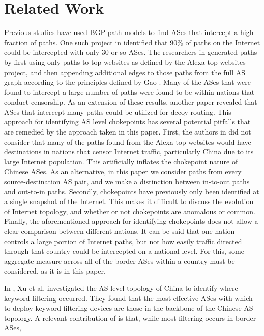 \section{Related Work}   
\par
Previous studies have used BGP path models to find ASes that
intercept a high fraction of paths. One such project in \cite{throats}
identified that 90\% of paths on the Internet could be intercepted with only 30
or so ASes. The researchers in \cite{throats} generated paths by first using
only paths to top websites as defined by the Alexa top websites project,
and then appending additional edges to those paths from the full
AS graph according to the principles defined by Gao \cite{gao}. Many of the
ASes that were found to intercept a large number of paths were found to be
within nations that conduct censorship. As an extension of these results,
another paper \cite{decoy} revealed that ASes that intercept many paths could
be utilized for decoy routing. This approach for identifying AS level
chokepoints has several potential pitfalls that are remedied by the approach
taken in this paper. First, the authors in \cite{throats} did not consider that
many of the paths found from the Alexa top websites would have destinations in
nations that censor Internet traffic, particularly China due to its large
Internet population. This artificially inflates the chokepoint nature of
Chinese ASes. As an alternative, in this paper we consider paths from every
source-destination AS pair, and we make a distinction between in-to-out paths
and out-to-in paths. Secondly, chokepoints have previously only been
identified at a single snapshot of the Internet. This makes it difficult to
discuss the evolution of Internet topology, and whether or not chokepoints are
anomalous or common. Finally, the aforementioned approach for identifying
chokepoints does not allow a clear comparison between different nations. It
can be said that one nation controls a large portion of Internet paths, but
not how easily traffic directed through that country could be intercepted on a
national level. For this, some aggregate measure across all of the border ASes
within a country must be considered, as it is in this paper.     
\par
In \cite{chinafiltering}, Xu et al. investigated the AS level topology of China
to identify where keyword filtering occurred. They found that the most
effective ASes with which to deploy keyword filtering devices are those in the
backbone of the Chinese AS topology. A relevant contribution of
\cite{chinafiltering} is that, while most filtering occurs in border ASes,
